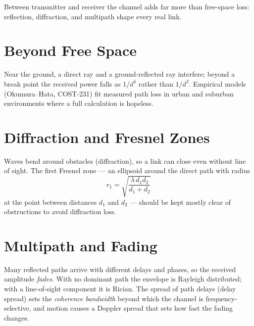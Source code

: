 Between transmitter and receiver the channel adds far more than free-space loss:
reflection, diffraction, and multipath shape every real link.

\section{Beyond Free Space}
Near the ground, a direct ray and a ground-reflected ray interfere; beyond a
break point the received power falls as $1/d^4$ rather than $1/d^2$. Empirical
models (Okumura--Hata, COST-231) fit measured path loss in urban and suburban
environments where a full calculation is hopeless.

\section{Diffraction and Fresnel Zones}
Waves bend around obstacles (diffraction), so a link can close even without line
of sight. The first Fresnel zone --- an ellipsoid around the direct path with
radius
\[ r_1 = \sqrt{\frac{\lambda\, d_1 d_2}{d_1 + d_2}} \]
at the point between distances $d_1$ and $d_2$ --- should be kept mostly clear of
obstructions to avoid diffraction loss.

\section{Multipath and Fading}
Many reflected paths arrive with different delays and phases, so the received
amplitude \emph{fades}. With no dominant path the envelope is Rayleigh
distributed; with a line-of-sight component it is Rician. The spread of path
delays (delay spread) sets the \emph{coherence bandwidth} beyond which the channel
is frequency-selective, and motion causes a Doppler spread that sets how fast the
fading changes.
